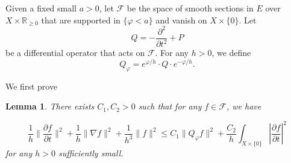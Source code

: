 \documentclass[12pt, reqno]{amsart}
\theoremstyle{plain}%
\newtheorem{lemma}[theorem]{Lemma}
\theoremstyle{definition}
\theoremstyle{remark}
\numberwithin{equation}{section}
\newcommand{\R}{\mathbb{R}}
\begin{document}
{Given a fixed small $a>0$, let $\mathcal F$ be the space of smooth sections in $E$ over $X\times\R_{\geq 0}$ that are supported in $\{\varphi< a\}$ and vanish on $X\times\{0\}$. }Let
$$Q=-\frac{\partial^2}{\partial t^2}+P$$
be a differential operator that acts on $\mathcal F$. For any $h>0$, we define
$$Q_{\varphi}=e^{\varphi/h}\cdot Q\cdot e^{-\varphi/h}.$$

We first prove
\begin{lemma}\label{lemma:local}
	There exists $C_1,C_2>0$ such that for any $f\in\mathcal F$, we have
	
		\begin{equation*}
		\frac 1 h\|\frac{\partial f }{\partial t} \|^2+\frac 1 h\|\nabla f\|^2+\frac{1}{h^3}\|f\|^2  \leq 	C_1\|Q_\varphi f\|^2+\frac{C_2}{h}\int_{X\times\{0\}}|\frac{\partial f}{\partial t}|^2
	\end{equation*}
	for any $h>0$ sufficiently small.
\end{lemma}
\end{document}
